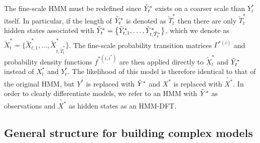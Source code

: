 The fine-scale HMM must be redefined since $\tilde{Y}^*_t$ exists on a coarser scale than $Y^*_t$ itself. In particular, if the length of $\tilde{Y}^*_t$ is denoted as $\tilde{T}_t^*$ then there are only $\tilde{T}_t^*$ hidden states associated with $\tilde{Y}^*_t = \big\{\tilde{Y}^*_{t,1},\ldots, \tilde{Y}^*_{t,\tilde{T}^*_t}\big\}$, which we denote as $\tilde{X}^*_t = \big\{\tilde{X}^*_{t,1},\ldots, \tilde{X}^*_{t,\tilde{T}^*_t}\big\}$. The fine-scale probability transition matrices  $\Gamma^{*(i)}$ and probability density functions $f^{*(i,i^*)}$ are then applied directly to $\tilde{X}^*_t$ and $\tilde{Y}^*_t$ instead of $X^*_t$ and $Y^*_t$. The likelihood of this model is therefore identical to that of the original HMM, but $Y^*$ is replaced with $\tilde{Y}^*$ and $X^*$ is replaced with $\tilde{X^*}$. In order to clearly differentiate models, we refer to an HMM with $\tilde{Y}^*$ as observations and $\tilde{X^*}$ as hidden states as an HMM-DFT.

\subsection{General structure for building complex models}

